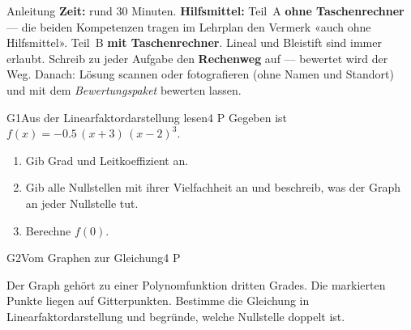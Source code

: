 \documentclass[11pt]{article}
\begin{document}

\begin{lpinfo}{Anleitung}
\textbf{Zeit:} rund 30 Minuten. \textbf{Hilfsmittel:} Teil~A \textbf{ohne Taschenrechner} — die beiden Kompetenzen tragen im Lehrplan den Vermerk «auch ohne Hilfsmittel». Teil~B \textbf{mit Taschenrechner}. Lineal und Bleistift sind immer erlaubt.
Schreib zu jeder Aufgabe den \textbf{Rechenweg} auf — bewertet wird der Weg.
Danach: Lösung scannen oder fotografieren (ohne Namen und Standort) und mit dem \emph{Bewertungspaket} bewerten lassen.
\end{lpinfo}


\begin{lpaufgabe}{G1}{Aus der Linearfaktordarstellung lesen}{4 P}
Gegeben ist $f(x) = -0.5\,(x+3)\,(x-2)^{3}$.
\begin{enumerate}[label=(\alph*),leftmargin=*,itemsep=1pt]
\item Gib Grad und Leitkoeffizient an.
\item Gib alle Nullstellen mit ihrer Vielfachheit an und beschreib, was der Graph an jeder Nullstelle tut.
\item Berechne $f(0)$.
\end{enumerate}
\end{lpaufgabe}

\begin{lpaufgabe}{G2}{Vom Graphen zur Gleichung}{4 P}
\begin{minipage}[t]{0.52\linewidth}
Der Graph gehört zu einer Polynomfunktion dritten Grades. Die markierten Punkte liegen auf Gitterpunkten.
Bestimme die Gleichung in Linearfaktordarstellung und begründe, welche Nullstelle doppelt ist.
\end{minipage}\hfill
\begin{minipage}[t]{0.42\linewidth}\vspace{0pt}\centering
{}
\end{minipage}
\end{lpaufgabe}
\end{document}
